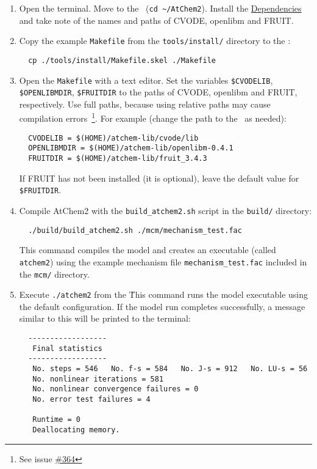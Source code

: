 \begin{enumerate}
\item Open the terminal. Move to the \maindir\ (\verb|cd ~/AtChem2|).
  Install the \hyperref[sec:dependencies]{Dependencies} and take note
  of the names and paths of CVODE, openlibm and FRUIT.
\item Copy the example \texttt{Makefile} from the
  \texttt{tools/install/} directory to the \maindir:
  \begin{verbatim}
  cp ./tools/install/Makefile.skel ./Makefile
  \end{verbatim}
\item Open the \texttt{Makefile} with a text editor. Set the variables
  \texttt{\$CVODELIB}, \texttt{\$OPENLIBMDIR}, \texttt{\$FRUITDIR} to
  the paths of CVODE, openlibm and FRUIT, respectively. Use full
  paths, because using relative paths may cause compilation
  errors~\footnote{See issue
    \href{https://github.com/AtChem/AtChem2/issues/364}{\#364}}.  For
  example (change the path to the \depdir\ as needed):
  \begin{verbatim}
  CVODELIB = $(HOME)/atchem-lib/cvode/lib
  OPENLIBMDIR = $(HOME)/atchem-lib/openlibm-0.4.1
  FRUITDIR = $(HOME)/atchem-lib/fruit_3.4.3
  \end{verbatim}
  If FRUIT has not been installed (it is optional), leave the default
  value for \texttt{\$FRUITDIR}.
\item Compile AtChem2 with the \texttt{build\_atchem2.sh} script in
  the \texttt{build/} directory:
  \begin{verbatim}
  ./build/build_atchem2.sh ./mcm/mechanism_test.fac
  \end{verbatim}
  This command compiles the model and creates an executable (called
  \texttt{atchem2}) using the example mechanism file
  \texttt{mechanism\_test.fac} included in the \texttt{mcm/}
  directory.
\item Execute \verb|./atchem2| from the \maindir\. This command runs
  the model executable using the default configuration. If the model
  run completes successfully, a message similar to this will be
  printed to the terminal:
  \begin{verbatim}
  ------------------
   Final statistics
  ------------------
   No. steps = 546   No. f-s = 584   No. J-s = 912   No. LU-s = 56
   No. nonlinear iterations = 581
   No. nonlinear convergence failures = 0
   No. error test failures = 4

   Runtime = 0
   Deallocating memory.
  \end{verbatim}
\end{enumerate}

